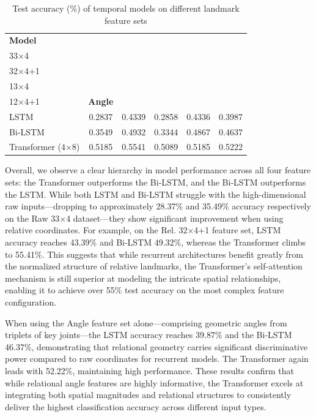 \documentclass[runningheads]{llncs}
\begin{document}
\begin{table}[!h]
\centering
\caption{Test accuracy (\%) of temporal models on different landmark feature sets}
\label{tab:accuracy-spatial-models}
\begin{tabular}{l c c c c c}
\hline
\textbf{Model}      & \makecell{\textbf{Raw}\\ 33$\times$4} & \makecell{\textbf{Rel.} \\ 32$\times$4+1} & \makecell{\textbf{Raw} \\ 13$\times$4} & \makecell{\textbf{Rel.}\\ 12$\times$4+1} & \textbf{Angle} \\
\hline
LSTM                & 0.2837                   & 0.4339                      & 0.2858                   & 0.4336                      & 0.3987        \\
Bi‐LSTM             & 0.3549                   & 0.4932                      & 0.3344                   & 0.4867                      & 0.4637        \\
Transformer (4×8)   & 0.5185                   & 0.5541                      & 0.5089                   & 0.5185                      & 0.5222        \\
\hline
\end{tabular}
\end{table}

Overall, we observe a clear hierarchy in model performance across all four feature sets: the Transformer outperforms the Bi‐LSTM, and the Bi‐LSTM outperforms the LSTM. While both LSTM and Bi-LSTM struggle with the high-dimensional raw inputs—dropping to approximately 28.37\% and 35.49\% accuracy respectively on the Raw 33×4 dataset—they show significant improvement when using relative coordinates. For example, on the Rel. 32×4+1 feature set, LSTM accuracy reaches 43.39\% and Bi-LSTM 49.32\%, whereas the Transformer climbs to 55.41\%. This suggests that while recurrent architectures benefit greatly from the normalized structure of relative landmarks, the Transformer’s self-attention mechanism is still superior at modeling the intricate spatial relationships, enabling it to achieve over 55\% test accuracy on the most complex feature configuration.

When using the Angle feature set alone—comprising geometric angles from triplets of key joints—the LSTM accuracy reaches 39.87\% and the Bi‐LSTM 46.37\%, demonstrating that relational geometry carries significant discriminative power compared to raw coordinates for recurrent models. The Transformer again leads with 52.22\%, maintaining high performance. These results confirm that while relational angle features are highly informative, the Transformer excels at integrating both spatial magnitudes and relational structures to consistently deliver the highest classification accuracy across different input types.
\end{document}
